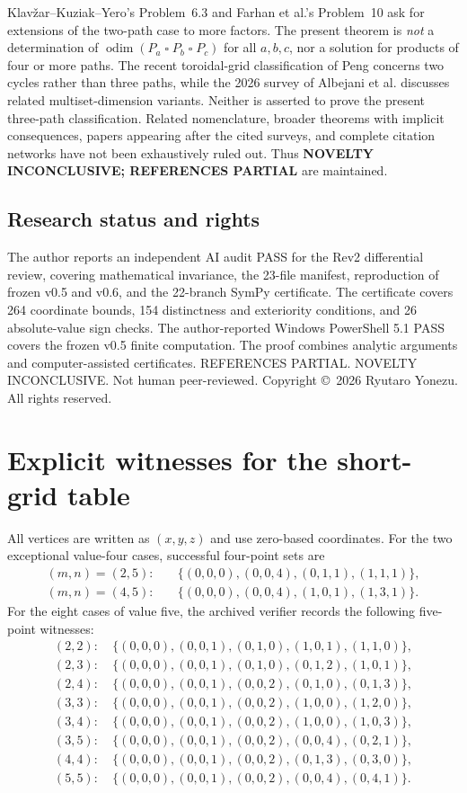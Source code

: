 \documentclass[10pt,a4paper]{article}
\newcommand{\odim}{\operatorname{odim}}
\newcommand{\boxp}{\mathbin{\square}}
\begin{document}
Klav\v{z}ar--Kuziak--Yero's Problem~6.3 and Farhan et al.'s Problem~10 ask for extensions of the two-path case to more factors. The present theorem is \emph{not} a determination of $\odim(P_a\boxp P_b\boxp P_c)$ for all $a,b,c$, nor a solution for products of four or more paths. The recent toroidal-grid classification of Peng \cite{Peng2026} concerns two cycles rather than three paths, while the 2026 survey of Albejani et al. \cite{Albejani2026} discusses related multiset-dimension variants. Neither is asserted to prove the present three-path classification. Related nomenclature, broader theorems with implicit consequences, papers appearing after the cited surveys, and complete citation networks have not been exhaustively ruled out. Thus \textbf{NOVELTY INCONCLUSIVE; REFERENCES PARTIAL} are maintained.

\subsection{Research status and rights}
The author reports an independent AI audit PASS for the Rev2 differential review, covering mathematical invariance, the 23-file manifest, reproduction of frozen v0.5 and v0.6, and the 22-branch SymPy certificate. The certificate covers 264 coordinate bounds, 154 distinctness and exteriority conditions, and 26 absolute-value sign checks. The author-reported Windows PowerShell 5.1 PASS covers the frozen v0.5 finite computation. The proof combines analytic arguments and computer-assisted certificates. REFERENCES PARTIAL. NOVELTY INCONCLUSIVE. Not human peer-reviewed. Copyright \copyright\ 2026 Ryutaro Yonezu. All rights reserved.

\appendix
\section{Explicit witnesses for the short-grid table}\label{app:witness}
All vertices are written as $(x,y,z)$ and use zero-based coordinates. For the two exceptional value-four cases, successful four-point sets are
\begin{align*}
(m,n)=(2,5):\quad &\{(0,0,0),(0,0,4),(0,1,1),(1,1,1)\},\\
(m,n)=(4,5):\quad &\{(0,0,0),(0,0,4),(1,0,1),(1,3,1)\}.
\end{align*}
For the eight cases of value five, the archived verifier records the following five-point witnesses:
\begin{align*}
(2,2):&\ \{(0,0,0),(0,0,1),(0,1,0),(1,0,1),(1,1,0)\},\\
(2,3):&\ \{(0,0,0),(0,0,1),(0,1,0),(0,1,2),(1,0,1)\},\\
(2,4):&\ \{(0,0,0),(0,0,1),(0,0,2),(0,1,0),(0,1,3)\},\\
(3,3):&\ \{(0,0,0),(0,0,1),(0,0,2),(1,0,0),(1,2,0)\},\\
(3,4):&\ \{(0,0,0),(0,0,1),(0,0,2),(1,0,0),(1,0,3)\},\\
(3,5):&\ \{(0,0,0),(0,0,1),(0,0,2),(0,0,4),(0,2,1)\},\\
(4,4):&\ \{(0,0,0),(0,0,1),(0,0,2),(0,1,3),(0,3,0)\},\\
(5,5):&\ \{(0,0,0),(0,0,1),(0,0,2),(0,0,4),(0,4,1)\}.
\end{align*}
\end{document}
